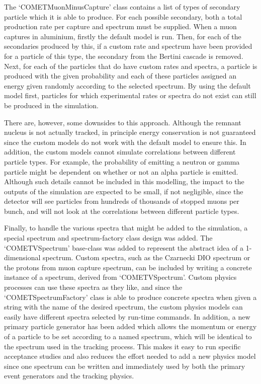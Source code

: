 The `COMETMuonMinusCapture' class contains a list of types of secondary particle which it is able to produce.  
For each possible secondary, both a total production rate per capture and spectrum must be supplied.
When a muon captures in aluminium, firstly the default model is run.
Then, for each of the secondaries produced by this, if a custom rate and spectrum have been provided for a particle of this type, the secondary from the Bertini cascade is removed.
Next, for each of the particles that do have custom rates and spectra, a particle is produced with the given probability and each of these particles assigned an energy given randomly according to the selected spectrum.
By using the default model first, particles for which experimental rates or spectra do not exist can still be produced in the simulation.

There are, however, some downsides to this approach.
Although the remnant nucleus is not actually tracked, in principle energy conservation is not guaranteed since the custom models do not work with the default model to ensure this.
In addition, the custom models cannot simulate correlations between different particle types. 
For example, the probability of emitting a neutron or gamma particle might be dependent on whether or not an alpha particle is emitted. 
Although such details cannot be included in this modelling, the impact to the outputs of the simulation are expected to be small, if not negligible, since the detector will see particles from hundreds of thousands of stopped muons per bunch, and will not look at the correlations between different particle types.

Finally, to handle the various spectra that might be added to the simulation, a special spectrum and spectrum-factory class design was added.
The `COMETVSpectrum' base-class was added to represent the abstract idea of a 1-dimensional spectrum.
Custom spectra, such as the Czarnecki \ac{DIO} spectrum or the \alcap protons from muon capture spectrum, can be included by writing a concrete instance of a spectrum, derived from `COMETVSpectrum'.
Custom physics processes can use these spectra as they like, and since the `COMETSpectrumFactory' class is able to produce concrete spectra when given a string with the name of the desired spectrum, the custom physics models can easily have different spectra selected by run-time commands.
In addition, a new primary particle generator has been added which allows the momentum or energy of a particle to be set according to a named spectrum, which will be identical to the spectrum used in the tracking process.
This makes it easy  to run specific acceptance studies and also reduces the effort needed to add a new physics model since one spectrum can be written and immediately used by both the primary event generators and the tracking physics.

